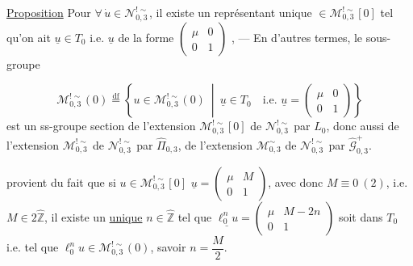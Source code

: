 \uline{Proposition} Pour $\forall\,\dot u\in\mathcal N_{0,3}^{!\sim}$, il existe un représentant unique  $\in\mathcal M_{0,3}^{!\sim}[0]$ tel qu'on ait $\underline u\in T_0$ i.e. $\underline u$ de la forme $\begin{pmatrix}\mu&0\\0&1\end{pmatrix}$
\inserted{[i.e. $\xi=\begin{pmatrix}A&B\\C&D\end{pmatrix}$ de la forme $\begin{pmatrix}A&0\\C&D\end{pmatrix}=\begin{pmatrix}\unsure{\ast|\frac{1}{D}}&0\\1-D&D\end{pmatrix}$]}, --- En d'autres termes, le sous-groupe


\[
\mathcal M_{0,3}^{!\sim}(0)\overset{\mathrm{df}}=
\left\{u\in\mathcal M_{0,3}^{!\sim}(0)\ \middle|\ \underline u\in T_0\quad\text{i.e. }\underline u=\begin{pmatrix}\mu&0\\0&1\end{pmatrix}\right\}
\tag{179}
\]
est un ss-groupe section de l'extension $\mathcal M_{0,3}^{!\sim}[0]$ de $\mathcal N_{0,3}^{!\sim}$ par $L_0$, donc aussi de l'extension $\mathcal M_{0,3}^{!\sim}$ de $\mathcal N_{0,3}^{!\sim}$ par $\widehat\Pi_{0,3}$,  de l'extension $\mathcal M_{0,3}^{\sim}$ de $\mathcal N_{0,3}^{!\sim}$ par $\widehat{\mathcal G}_{0,3}^{+}$.

 provient du fait que si $u\in\mathcal M_{0,3}^{!\sim}[0]$  $\underline u=\begin{pmatrix}\mu&M\\0&1\end{pmatrix}$, avec donc $M\equiv0\ (2)$, i.e. $M\in2\widehat{\mathbb Z}$, il existe un \uline{unique} $n\in\widehat{\mathbb Z}$ tel que $\underline{\ell_0^n u}=\begin{pmatrix}\mu&M-2n\\0&1\end{pmatrix}$ soit dans $T_0$ i.e. tel que $\ell_0^n u\in\mathcal M_{0,3}^{!\sim}(0)$, savoir $n=\dfrac M2$.

